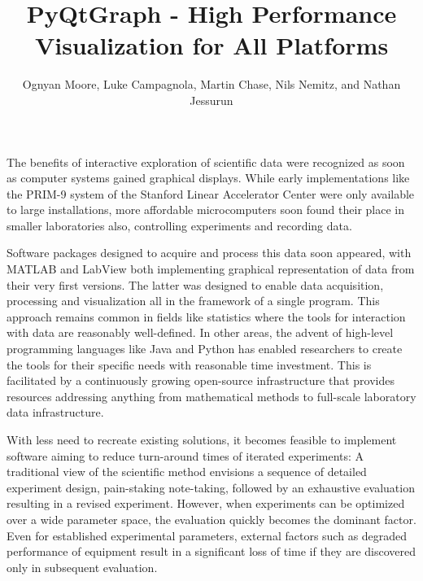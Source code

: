\documentclass[journal]{vgtc}                %
\title{PyQtGraph - High Performance Visualization for All Platforms}
\author{Ognyan Moore, Luke Campagnola, Martin Chase, Nils Nemitz, and Nathan Jessurun}
\begin{document}

\maketitle

The benefits of interactive exploration of scientific data were recognized as soon as computer systems gained graphical displays. While early implementations like the PRIM-9 system\cite{prim9} of the Stanford Linear Accelerator Center were only available to large installations, more affordable microcomputers soon found their place in smaller laboratories also\cite{Byrd79}\cite{Reed80}, controlling experiments and recording data.

Software packages designed to acquire and process this data soon appeared, with MATLAB\cite{matlab} and LabView\cite{labview} both implementing graphical representation of data from their very first versions. The latter was designed to enable data acquisition, processing and visualization all in the framework of a single program. This approach remains common in fields like statistics where the tools for interaction with data are reasonably well-defined. In other areas, the advent of high-level programming languages like Java and Python has enabled researchers to create the tools for their specific needs with reasonable time investment. This is facilitated by a continuously growing open-source infrastructure that provides resources addressing anything from mathematical methods\cite{numpy2020} to full-scale laboratory data infrastructure\cite{Johnson2015, Koerner2019}.

With less need to recreate existing solutions, it becomes feasible to implement software aiming to reduce turn-around times of iterated experiments: A traditional view of the scientific method envisions a sequence of detailed experiment design, pain-staking note-taking, followed by an exhaustive evaluation resulting in a revised experiment. However, when experiments can be optimized over a wide parameter space, the evaluation quickly becomes the dominant factor. Even for established experimental parameters, external factors such as degraded performance of equipment result in a significant loss of time if they are discovered only in subsequent evaluation.
\end{document}
